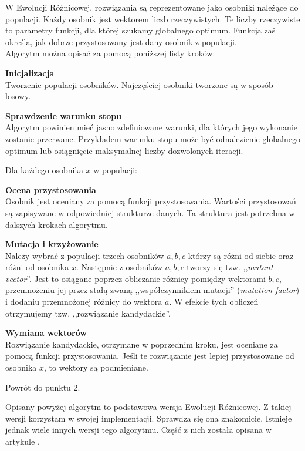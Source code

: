 W Ewolucji Różnicowej, rozwiązania są reprezentowane jako osobniki należące do populacji. Każdy osobnik jest wektorem liczb rzeczywistych. Te liczby rzeczywiste to parametry funkcji, dla której szukamy globalnego optimum. Funkcja zaś określa, jak dobrze przystosowany jest dany osobnik z populacji. \\
Algorytm można opisać za pomocą poniższej listy kroków:
\begin{enumerate*}
\item \textbf{Inicjalizacja} \\
Tworzenie populacji osobników. Najczęściej osobniki tworzone są w sposób losowy.
\item \textbf{Sprawdzenie warunku stopu} \\
Algorytm powinien mieć jasno zdefiniowane warunki, dla których jego wykonanie zostanie przerwane. Przykładem warunku stopu może być odnalezienie globalnego optimum lub osiągnięcie maksymalnej liczby dozwolonych iteracji.
\item Dla każdego osobnika $x$ w populacji:
\begin{enumerate*}
\item \textbf{Ocena przystosowania} \\
Osobnik jest oceniany za pomocą funkcji przystosowania. Wartości przystosowań są zapisywane w odpowiedniej strukturze danych. Ta struktura jest potrzebna w dalszych krokach algorytmu.
\item \textbf{Mutacja i krzyżowanie} \\
Należy wybrać z populacji trzech osobników $a, b, c$ którzy są różni od siebie oraz różni od osobnika $x$. Następnie z osobników $a, b, c$ tworzy się tzw. ,,\textit{mutant vector}''. Jest to osiągane poprzez obliczanie różnicy pomiędzy wektorami $b, c$, przemnożeniu jej przez stałą zwaną ,,współczynnikiem mutacji'' (\textit{mutation factor}) i dodaniu przemnożonej różnicy do wektora $a$.
W efekcie tych obliczeń otrzymujemy tzw. ,,rozwiązanie kandydackie''.
\item \textbf{Wymiana wektorów} \\
Rozwiązanie kandydackie, otrzymane w poprzednim kroku, jest oceniane za pomocą funkcji przystosowania. Jeśli te rozwiązanie jest lepiej przystosowane od osobnika $x$, to wektory są podmieniane.
\end{enumerate*}
\item Powrót do punktu 2.
\end{enumerate*}

Opisany powyżej algorytm to podstawowa wersja Ewolucji Różnicowej. Z takiej wersji korzystam w swojej implementacji. Sprawdza się ona znakomicie. Istnieje jednak wiele innych wersji tego algorytmu. Część z nich została opisana w artykule \cite{de:tutorial}.

